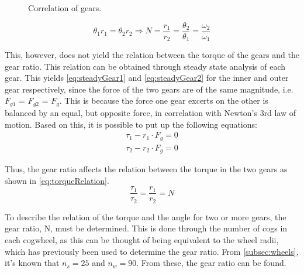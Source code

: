 \begin{figure}[H]
\centering
\scalebox{1}{}
\caption{Correlation of gears.}
\label{fig:gearsRelation}
\end{figure}

\begin{equation}
\theta_1r_1 = \theta_2r_2 \Rightarrow N = \frac{r_1}{r_2} = \frac{\theta_2}{\theta_1} = \frac{\omega_2}{\omega_1}
\label{eq:gearRatio}
\end{equation}
\begin{where}
\end{where}

This, however, does not yield the relation between the torque of the gears and the gear ratio. This relation can be obtained through steady state analysis of each gear. This yields \autoref{eq:steadyGear1} and \autoref{eq:steadyGear2} for the inner and outer gear respectively, since the force of the two gears are of the same magnitude, i.e. $F_{g1}$ = $F_{g2}$ = $F_g$. This is because the force one gear excerts on the other is balanced by an equal, but opposite force, in correlation with Newton's 3rd law of motion. Based on this, it is possible to put up the following equations:
\begin{align}
\tau_1 - r_1\cdot F_g = 0 \label{eq:steadyGear1}
\\
\tau_2 - r_2\cdot F_g = 0\label{eq:steadyGear2}
\end{align}
\begin{where}
\end{where}

Thus, the gear ratio affects the relation between the torque in the two gears as shown in \autoref{eq:torqueRelation}.
\begin{equation}
\frac{\tau_1}{\tau_2} = \frac{r_1}{r_2} = N
\label{eq:torqueRelation}
\end{equation}

To describe the relation of the torque and the angle for two or more gears, the gear ratio, N, must be determined. This is done through the number of cogs in each cogwheel, as this can be thought of being equivalent to the wheel radii, which has previously been used to determine the gear ratio. From \autoref{subsec:wheels}, it's known that $n_s = 25$ and $n_w = 90$. From these, the gear ratio can be found.

